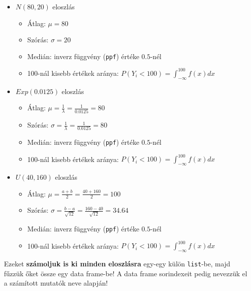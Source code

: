 \documentclass[
]{book}
\providecommand{\tightlist}{%
  \setlength{\itemsep}{0pt}\setlength{\parskip}{0pt}}
\begin{document}
\begin{itemize}
\tightlist
\item
  \(N(80,20)\) eloszlás

  \begin{itemize}
  \tightlist
  \item
    Átlag: \(\mu=80\)
  \item
    Szórás: \(\sigma=20\)
  \item
    Medián: inverz függvény (\texttt{ppf}) értéke \(0.5\)-nél
  \item
    100-nál kisebb értékek aránya: \(P(Y_i<100)=\int_{-\infty}^{100}{f(x)}dx\)
  \end{itemize}
\item
  \(Exp(0.0125)\) eloszlás

  \begin{itemize}
  \tightlist
  \item
    Átlag: \(\mu=\frac{1}{\lambda}=\frac{1}{0.0125}=80\)
  \item
    Szórás: \(\sigma=\frac{1}{\lambda}=\frac{1}{0.0125}=80\)
  \item
    Medián: inverz függvény (\texttt{ppf}) értéke \(0.5\)-nél
  \item
    100-nál kisebb értékek aránya: \(P(Y_i<100)=\int_{-\infty}^{100}{f(x)}dx\)
  \end{itemize}
\item
  \(U(40,160)\) eloszlás

  \begin{itemize}
  \tightlist
  \item
    Átlag: \(\mu=\frac{a+b}{2}=\frac{40+160}{2}=100\)
  \item
    Szórás: \(\sigma=\frac{b-a}{\sqrt{12}}=\frac{160-40}{\sqrt{12}}=34.64\)
  \item
    Medián: inverz függvény (\texttt{ppf}) értéke \(0.5\)-nél
  \item
    100-nál kisebb értékek aránya: \(P(Y_i<100)=\int_{-\infty}^{100}{f(x)}dx\)
  \end{itemize}
\end{itemize}

Ezeket \textbf{számoljuk is ki minden eloszlásra} egy-egy külön \texttt{list}-be, majd fűzzük őket össze egy data frame-be! A data frame sorindexeit pedig nevezzük el a számított mutatók neve alapján!
\end{document}
